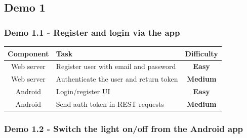 \documentclass[onecolumn]{IEEEtran}
\newcommand{\easy}{{\color{green} \textbf{Easy}}}
\newcommand{\medium}{{\color{orange} \textbf{Medium}}}
\begin{document}
\subsection{Demo 1}

\subsubsection{Demo 1.1 - Register and login via the app}

\begin{center}
    \begin{tabularx}{0.8\linewidth}{|c|L|c|}
        \hline
        \textbf{Component} & \textbf{Task} & \textbf{Difficulty} \\
        \hline
        Web server & Register user with email and password & \easy \\
        \hline
        Web server & Authenticate the user and return token & \medium \\
        \hline
        Android & Login/register UI & \easy \\
        \hline
        Android & Send auth token in REST requests & \medium \\
        \hline
    \end{tabularx}
\end{center}

\subsubsection{Demo 1.2 - Switch the light on/off from the Android app}
\end{document}
